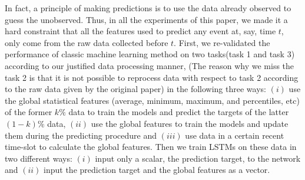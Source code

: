 \documentclass[sigconf]{acmart}
\begin{document}
	In fact, a principle of making predictions is to use the data already observed to guess the unobserved. Thus, in all the experiments of this paper, we made it a hard constraint that all the features used to predict any event at, say, time $t$, only come from the raw data collected before $t$. First, we re-validated the performance of classic machine learning method on two tasks(task 1 and task 3) according to our justified data processing manner, (The reason why we miss the task 2 is that it is not possible to reprocess data with respect to task 2 according to the raw data given by the original paper) in the following three ways: $(i)$ use the global statistical features (average, minimum, maximum, and percentiles, etc) of the former $k\%$ data to train the models and predict the targets of the latter $(1-k)\%$ data, $(ii)$ use the global features to train the models and update them during the predicting procedure and $(iii)$ use data in a certain recent time-slot to calculate the global features. Then we train LSTMs on these data in two different ways: $(i)$ input only a scalar, the prediction target, to the network and $(ii)$ input the prediction target and the global features as a vector.
	
\end{document}
